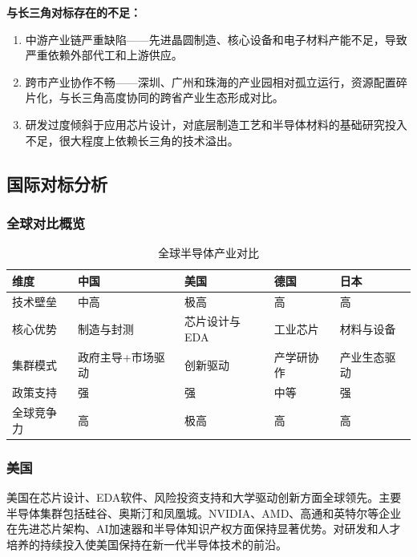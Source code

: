 \documentclass[12pt,a4paper]{article}
\newcommand{\tableHeaderRow}{\rowcolor{tealPrimary}\color{white}}
\newcommand{\tableOddRow}{\rowcolor{mintBG}}
\newcommand{\tableEvenRow}{\rowcolor{white}}
\begin{document}
\textbf{与长三角对标存在的不足：}
\begin{enumerate}[label=(\arabic*)]
    \item 中游产业链严重缺陷——先进晶圆制造、核心设备和电子材料产能不足，导致严重依赖外部代工和上游供应。
    \item 跨市产业协作不畅——深圳、广州和珠海的产业园相对孤立运行，资源配置碎片化，与长三角高度协同的跨省产业生态形成对比。
    \item 研发过度倾斜于应用芯片设计，对底层制造工艺和半导体材料的基础研究投入不足，很大程度上依赖长三角的技术溢出。
\end{enumerate}

\subsection{国际对标分析}
\label{sec:international_comparison}

\subsubsection{全球对比概览}

\begin{table}[H]
\centering
\caption{全球半导体产业对比}
\label{tab:global_compare}
\begin{tabular}{p{2.5cm}p{2.8cm}p{2.8cm}p{2.8cm}p{2.8cm}}
\toprule
\tableHeaderRow
\textbf{维度} & \textbf{中国} & \textbf{美国} & \textbf{德国} & \textbf{日本} \\
\midrule
\tableOddRow 技术壁垒 & 中高 & 极高 & 高 & 高 \\
\tableEvenRow 核心优势 & 制造与封测 & 芯片设计与EDA & 工业芯片 & 材料与设备 \\
\tableOddRow 集群模式 & 政府主导+市场驱动 & 创新驱动 & 产学研协作 & 产业生态驱动 \\
\tableEvenRow 政策支持 & 强 & 强 & 中等 & 强 \\
\tableOddRow 全球竞争力 & 高 & 极高 & 高 & 高 \\
\bottomrule
\end{tabular}
\end{table}

\subsubsection{美国}

美国在芯片设计、EDA软件、风险投资支持和大学驱动创新方面全球领先。主要半导体集群包括硅谷、奥斯汀和凤凰城。NVIDIA、AMD、高通和英特尔等企业在先进芯片架构、AI加速器和半导体知识产权方面保持显著优势。对研发和人才培养的持续投入使美国保持在新一代半导体技术的前沿。
\end{document}
